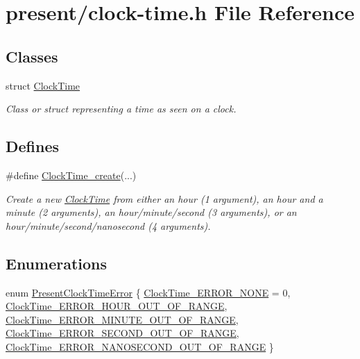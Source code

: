\hypertarget{clock-time_8h}{\section{present/clock-\/time.h \-File \-Reference}
\label{clock-time_8h}
}
\subsection*{\-Classes}
\begin{DoxyCompactItemize}
\item 
struct \hyperlink{structClockTime}{\-Clock\-Time}
\begin{DoxyCompactList}\small\item\em \-Class or struct representing a time as seen on a clock. \end{DoxyCompactList}\end{DoxyCompactItemize}
\subsection*{\-Defines}
\begin{DoxyCompactItemize}
\item 
\#define \hyperlink{clock-time_8h_a58ff623c2c94ef13508ea9d85cbdfad7}{\-Clock\-Time\-\_\-create}(...)
\begin{DoxyCompactList}\small\item\em \-Create a new \hyperlink{structClockTime}{\-Clock\-Time} from either an hour (1 argument), an hour and a minute (2 arguments), an hour/minute/second (3 arguments), or an hour/minute/second/nanosecond (4 arguments). \end{DoxyCompactList}\end{DoxyCompactItemize}
\subsection*{\-Enumerations}
\begin{DoxyCompactItemize}
\item 
enum \hyperlink{clock-time_8h_a40f97cceae12156ea6da9bd1c170d455}{\-Present\-Clock\-Time\-Error} \{ \*
\hyperlink{clock-time_8h_a40f97cceae12156ea6da9bd1c170d455a1d641b8c2d8a813161b336d677d442ce}{\-Clock\-Time\-\_\-\-E\-R\-R\-O\-R\-\_\-\-N\-O\-N\-E} =  0, 
\*
\hyperlink{clock-time_8h_a40f97cceae12156ea6da9bd1c170d455a06eb41881d9ecd5b58f9da51e669d882}{\-Clock\-Time\-\_\-\-E\-R\-R\-O\-R\-\_\-\-H\-O\-U\-R\-\_\-\-O\-U\-T\-\_\-\-O\-F\-\_\-\-R\-A\-N\-G\-E}, 
\*
\hyperlink{clock-time_8h_a40f97cceae12156ea6da9bd1c170d455a97838040e41b51850fe9396a9510b2a9}{\-Clock\-Time\-\_\-\-E\-R\-R\-O\-R\-\_\-\-M\-I\-N\-U\-T\-E\-\_\-\-O\-U\-T\-\_\-\-O\-F\-\_\-\-R\-A\-N\-G\-E}, 
\*
\hyperlink{clock-time_8h_a40f97cceae12156ea6da9bd1c170d455a6fea4dad5bdfc5694d2b9b10329b2338}{\-Clock\-Time\-\_\-\-E\-R\-R\-O\-R\-\_\-\-S\-E\-C\-O\-N\-D\-\_\-\-O\-U\-T\-\_\-\-O\-F\-\_\-\-R\-A\-N\-G\-E}, 
\*
\hyperlink{clock-time_8h_a40f97cceae12156ea6da9bd1c170d455a566b9c3744b31c19afef95634db50139}{\-Clock\-Time\-\_\-\-E\-R\-R\-O\-R\-\_\-\-N\-A\-N\-O\-S\-E\-C\-O\-N\-D\-\_\-\-O\-U\-T\-\_\-\-O\-F\-\_\-\-R\-A\-N\-G\-E}
 \}
\end{DoxyCompactItemize}
